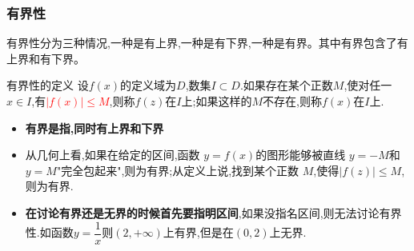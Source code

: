 \documentclass[8pt a4paper, oneside, UTF8]{ctexbook}  %
\begin{document}
\begin{sloppypar}
    \subsubsection{有界性}
    有界性分为三种情况,一种是有上界,一种是有下界,一种是有界。其中有界包含了有上界和有下界。
    \begin{defn}{有界性的定义}{}
        设$f(x)$的定义域为$D$,数集$I \subset D$.如果存在某个正数$M$,使对任一$x \in I$,有\textcolor{red}{$|f(x)| \leqslant M$},则称$f(z)$在$I$上;如果这样的$M$不存在,则称$f(x)$在$I$上.
    \end{defn}
    \begin{itemize}\label{yjxpd1}
        \item \textbf{有界是指,同时有上界和下界}
        \item 从几何上看,如果在给定的区间,函数 $y=f(x)$的图形能够被直线 $y=-M$和 $y=M$"完全包起来",则为有界;从定义上说,找到某个正数 $M$,使得$|f(z)| \leqslant M$,则为有界.
        \item \textbf{在讨论有界还是无界的时候首先要指明区间},如果没指名区间,则无法讨论有界性.如函数$y=\dfrac{1}{x}$则$(2,+\infty)$上有界,但是在$(0,2)$上无界.
    \end{itemize}

\end{sloppypar}
\end{document}
